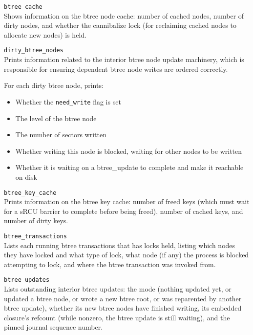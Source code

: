 \documentclass{article}
\begin{document}
\begin{description}
	\item \texttt{btree\_cache} \\
		Shows information on the btree node cache: number of cached
		nodes, number of dirty nodes, and whether the cannibalize lock
		(for reclaiming cached nodes to allocate new nodes) is held.

	\item \texttt{dirty\_btree\_nodes} \\
		Prints information related to the interior btree node update
		machinery, which is responsible for ensuring dependent btree
		node writes are ordered correctly.

		For each dirty btree node, prints:
		\begin{itemize}
			\item Whether the \texttt{need\_write} flag is set
			\item The level of the btree node
			\item The number of sectors written
			\item Whether writing this node is blocked, waiting for
				other nodes to be written
			\item Whether it is waiting on a btree\_update to
				complete and make it reachable on-disk
		\end{itemize}

	\item \texttt{btree\_key\_cache} \\
		Prints information on the btree key cache: number of freed keys
		(which must wait for a sRCU barrier to complete before being
		freed), number of cached keys, and number of dirty keys.

	\item \texttt{btree\_transactions} \\
		Lists each running btree transactions that has locks held,
		listing which nodes they have locked and what type of lock, what
		node (if any) the process is blocked attempting to lock, and
		where the btree transaction was invoked from.

	\item \texttt{btree\_updates} \\
		Lists outstanding interior btree updates: the mode (nothing
		updated yet, or updated a btree node, or wrote a new btree root,
		or was reparented by another btree update), whether its new
		btree nodes have finished writing, its embedded closure's
		refcount (while nonzero, the btree update is still waiting), and
		the pinned journal sequence number.


\end{description}
\end{document}
